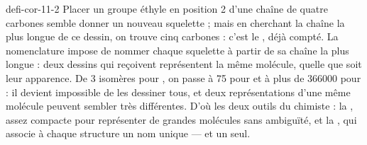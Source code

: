 \begin{blocEdition}{defi-cor-11-2}
\label{figedition-defi-cor-11-2-1}
Placer un groupe éthyle en position 2 d'une chaîne de quatre carbones semble donner un nouveau squelette ; mais en
cherchant la chaîne la plus longue de ce dessin, on trouve cinq carbones : c'est le ,
déjà compté. La nomenclature impose de nommer chaque squelette à partir de sa chaîne la plus longue : deux dessins qui
reçoivent  représentent la même molécule, quelle que soit leur apparence.
De 3 isomères pour , on passe à 75 pour  et à plus de \num{366000} pour  : il devient
impossible de les dessiner tous, et deux représentations d'une même molécule peuvent sembler très différentes. D'où
les deux outils du chimiste : la , assez compacte pour représenter de grandes
molécules sans ambiguïté, et la , qui associe à chaque structure un nom unique
— et un seul.
\end{blocEdition}

